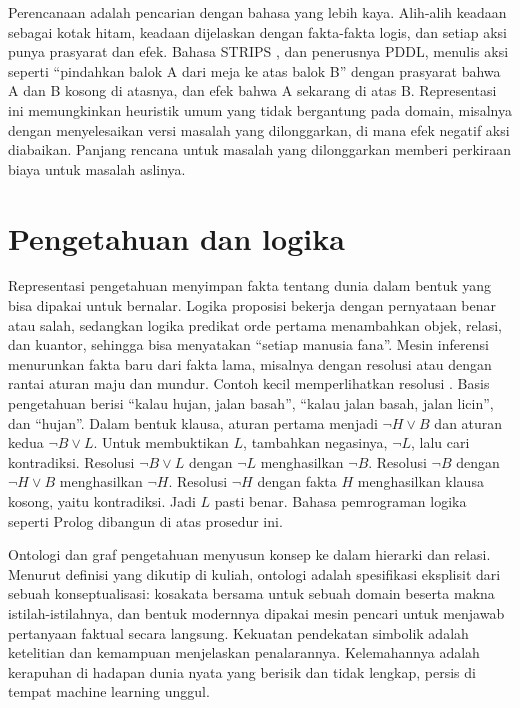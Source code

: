 Perencanaan adalah pencarian dengan bahasa yang lebih kaya. Alih-alih keadaan sebagai kotak hitam,
keadaan dijelaskan dengan fakta-fakta logis, dan setiap aksi punya prasyarat dan efek. Bahasa STRIPS
\citep{fikes1971}, dan penerusnya PDDL, menulis aksi seperti ``pindahkan balok A dari meja ke atas
balok B'' dengan prasyarat bahwa A dan B kosong di atasnya, dan efek bahwa A sekarang di atas B.
Representasi ini memungkinkan heuristik umum yang tidak bergantung pada domain, misalnya dengan
menyelesaikan versi masalah yang dilonggarkan, di mana efek negatif aksi diabaikan. Panjang rencana
untuk masalah yang dilonggarkan memberi perkiraan biaya untuk masalah aslinya.

\section{Pengetahuan dan logika}

Representasi pengetahuan menyimpan fakta tentang dunia dalam bentuk yang bisa dipakai untuk
bernalar. Logika proposisi bekerja dengan pernyataan benar atau salah, sedangkan logika predikat
orde pertama menambahkan objek, relasi, dan kuantor, sehingga bisa menyatakan ``setiap manusia
fana''. Mesin inferensi menurunkan fakta baru dari fakta lama, misalnya dengan resolusi atau
dengan rantai aturan maju dan mundur. Contoh kecil memperlihatkan resolusi \citep{robinson1965}. Basis pengetahuan berisi ``kalau hujan, jalan basah'',
``kalau jalan basah, jalan licin'', dan ``hujan''. Dalam bentuk klausa, aturan pertama menjadi $\neg H\lor B$ dan
aturan kedua $\neg B\lor L$. Untuk membuktikan $L$, tambahkan negasinya, $\neg L$, lalu cari kontradiksi. Resolusi
$\neg B\lor L$ dengan $\neg L$ menghasilkan $\neg B$. Resolusi $\neg B$ dengan $\neg H\lor B$ menghasilkan $\neg H$.
Resolusi $\neg H$ dengan fakta $H$ menghasilkan klausa kosong, yaitu kontradiksi. Jadi $L$ pasti benar. Bahasa
pemrograman logika seperti Prolog dibangun di atas prosedur ini.

Ontologi dan graf pengetahuan menyusun konsep ke dalam
hierarki dan relasi. Menurut definisi yang dikutip di kuliah, ontologi adalah spesifikasi eksplisit dari sebuah
konseptualisasi: kosakata bersama untuk sebuah domain beserta makna istilah-istilahnya, dan bentuk modernnya dipakai mesin pencari untuk menjawab pertanyaan faktual
secara langsung. Kekuatan pendekatan simbolik adalah ketelitian dan kemampuan menjelaskan
penalarannya. Kelemahannya adalah kerapuhan di hadapan dunia nyata yang berisik dan tidak lengkap,
persis di tempat machine learning unggul.

